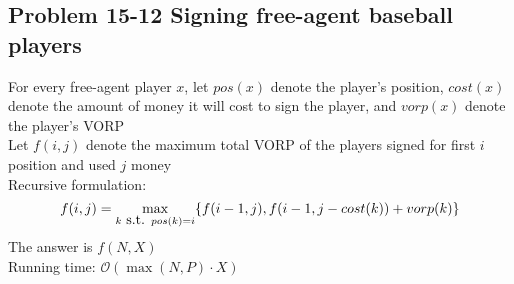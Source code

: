\subsection*{Problem 15-12 Signing free-agent baseball players}
\noindent For every free-agent player $x$, let $pos(x)$ denote the player's position, $cost(x)$ denote the amount of money it will cost to sign the player, and $vorp(x)$ denote the player's VORP \\
Let $f(i, j)$ denote the maximum total VORP of the players signed for first $i$ position and used $j$ money \\
Recursive formulation:
\begin{equation} \notag
	f(i, j) = \max_{k \mbox{ s.t. } pos(k) = i} \{f(i - 1, j), f(i - 1, j - cost(k)) + vorp(k)\}
\end{equation}
The answer is $f(N, X)$ \\
Running time: $\mathcal{O}(\max(N, P)\cdot X)$

